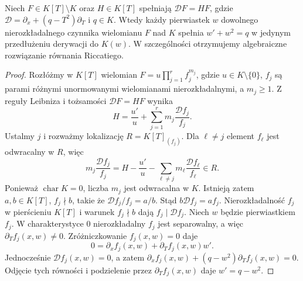 \begin{lemat}
\label{aa:lem:kov3-roots}
Niech $F\in K[T]\setminus K$
oraz $H\in K[T]$
spełniają $\mathcal DF=HF$,
gdzie
$\mathcal D=\partial_x+(q-T^2)\partial_T$
i $q\in K$.
Wtedy każdy pierwiastek
$w$ dowolnego nierozkładalnego
czynnika wielomianu $F$
nad $K$ spełnia
$w'+w^2=q$ w jedynym
przedłużeniu derywacji
do $K(w)$.
W szczególności otrzymujemy
algebraiczne rozwiązanie
równania Riccatiego.
\end{lemat}
\begin{proof}
Rozłóżmy w $K[T]$ wielomian
$F=u\prod_{j=1}^r f_j^{m_j}$,
gdzie $u\in K\setminus\{0\}$,
$f_j$ są parami różnymi unormowanymi
wielomianami nierozkładalnymi,
a $m_j\ge1$. Z reguły Leibniza
i tożsamości $\mathcal DF=HF$ wynika
\[
 H=\frac{u'}u+
 \sum_{j=1}^r m_j\frac{\mathcal Df_j}{f_j}.
\]
Ustalmy $j$ i rozważmy lokalizację
$R=K[T]_{(f_j)}$.
Dla $\ell\ne j$ element $f_\ell$
jest odwracalny w $R$, więc
\[
 m_j\frac{\mathcal Df_j}{f_j}
 =H-\frac{u'}u
 -\sum_{\ell\ne j}m_\ell
      \frac{\mathcal Df_\ell}{f_\ell}\in R.
\]
Ponieważ $\operatorname{char}K=0$,
liczba $m_j$ jest odwracalna w $K$.
Istnieją zatem $a,b\in K[T]$,
$f_j\nmid b$, takie że
$\mathcal Df_j/f_j=a/b$.
Stąd $b\mathcal Df_j=af_j$.
Nierozkładalność $f_j$ w pierścieniu
$K[T]$ i warunek $f_j\nmid b$
dają $f_j\mid\mathcal Df_j$.
Niech $w$ będzie
pierwiastkiem $f_j$.
W charakterystyce $0$
nierozkładalny $f_j$
jest separowalny, a więc
$\partial_T f_j(x,w)\ne0$.
Zróżniczkowanie
$f_j(x,w)=0$ daje
\[
 0=\partial_x f_j(x,w)
   +\partial_T f_j(x,w)w'.
\]
Jednocześnie
$\mathcal D f_j(x,w)=0$,
a zatem
$\partial_x f_j(x,w)
 +(q-w^2)\partial_T f_j(x,w)=0$.
Odjęcie tych równości
i podzielenie przez
$\partial_Tf_j(x,w)$
daje $w'=q-w^2$.
\end{proof}

